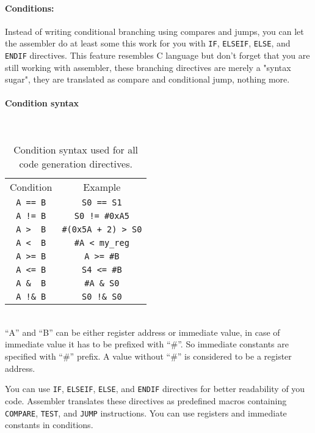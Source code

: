     \paragraph{Conditions:} Instead of writing conditional branching using compares and jumps, you can let the assembler do at least some this work for you with \texttt{IF}, \texttt{ELSEIF}, \texttt{ELSE}, and \texttt{ENDIF} directives. This feature resembles C language but don't forget that you are still working with assembler, these branching directives are merely a "syntax sugar", they are translated as compare and conditional jump, nothing more.

    \paragraph{Condition syntax}
        ~\\
        \begin{table}[h!]
            \mysmallfont{}
            \centering{}
            \begin{tabular}{|c|c|}
                \hline
                Condition & Example  \\
                \verb'A == B' & \verb'S0 == S1' \\
                \verb'A != B' & \verb'S0 != #0xA5' \\
                \verb'A >  B' & \verb'#(0x5A + 2) > S0' \\
                \verb'A <  B' & \verb'#A < my_reg' \\
                \verb'A >= B' & \verb'A >= #B' \\
                \verb'A <= B' & \verb'S4 <= #B' \\
                \verb'A &  B' & \verb'#A & S0' \\
                \verb'A !& B' & \verb'S0 !& S0' \\\hline
            \end{tabular}
            \caption{Condition syntax used for all code generation directives.}
        \end{table}

        ~\\``A'' and ``B'' can be either register address or immediate value, in case of immediate value it has to be prefixed with ``\#''. So immediate constants are specified with ``\#'' prefix. A value without ``\#'' is considered to be a register address.

        You can use \texttt{IF}, \texttt{ELSEIF}, \texttt{ELSE}, and \texttt{ENDIF} directives for better readability of you code. Assembler translates these directives as predefined macros containing \texttt{COMPARE}, \texttt{TEST}, and \texttt{JUMP} instructions. You can use registers and immediate constants in conditions.

